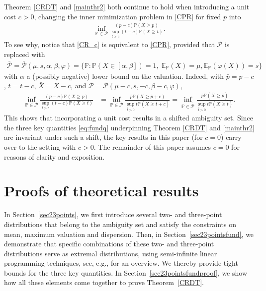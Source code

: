 \documentclass[11pt]{article}
\renewcommand{\P}{\mathbb{P}}
\newcommand{\E}{\mathbb{E}}
\newcommand{\Prob}{\mathbb{P}}
\newcommand{\bP}{\mathbb{P}}
\newcommand{\cP}{\mathcal{P}}
\newcommand{\1}{\mathds{1}}
\begin{document}
Theorem \ref{CRDT} and \ref{mainthr2} both continue to hold when introducing a unit cost $c>0$, changing the inner minimization problem in \eqref{CPR} for fixed $p$ into
\begin{align}\label{CR_c}
    \inf_{\bP\in\cP}\frac{(p-c)\bP(X\geq p)}{\sup_{t>c}(t-c)\bP(X\geq t)}.
\end{align}
To see why, notice that \eqref{CR_c} is equivalent to %
\eqref{CPR}, provided that $\cP$ is replaced with
\begin{align}  
\bar{\cP} = \bar{\cP}(\mu,s,\alpha,\beta,\varphi) =  \{\Prob :  \bP(X \in [\alpha,\beta])=1,\; \E_{\P}(X) = \mu, \E_{\P}(\varphi(X)) = s\}
    \label{eq:ambiguityk2}
\end{align}
with $\alpha$ a (possibly negative) lower bound on the valuation. Indeed, with $\bar{p}=p-c$, $\bar{t} = t - c$, $\bar{X} = X - c$, and $\bar{\cP} = \bar{\cP}(\mu-c,s,-c,\beta-c,\varphi)$,
\begin{align}
    \inf_{\bP\in\cP}\frac{(p-c)\bP(X\geq p)}{\sup_{t>c}(t-c)\bP(X\geq t)} &= \inf_{\bP\in\cP}\frac{\bar{p}\bP(X\geq \bar{p}+c)}{\sup_{\bar{t}>0}\bar{t}\bP(X\geq \bar{t}+c)}=\inf_{\bP\in\bar{\cP}}\frac{\bar{p}\bP(\bar{X}\geq \bar{p})}{\sup_{\bar{t}>0}\bar{t}\bP(\bar{X}\geq \bar{t})}.
\end{align}
This shows that incorporating a unit cost results in a shifted ambiguity set. Since the three key quantities \eqref{eq:fundq} underpinning Theorem \ref{CRDT} and \ref{mainthr2} are invariant under such a shift, the key results in this paper (for $c=0$) carry over to the setting with $c>0$. The remainder of this paper assumes 
$c=0$ for reasons of clarity and exposition. 

\section{Proofs of theoretical results}\label{prroooffs}
In Section~\ref{sec23points}, we first introduce several two- and three-point distributions that belong to the ambiguity set and satisfy the constraints on mean, maximum valuation and dispersion. Then, in Section~\ref{sec23pointsfund}, we demonstrate that specific combinations of these two- and three-point distributions serve as extremal distributions, using semi-infinite linear programming techniques, see, e.g., \cite{popescu2005semidefinite} for an overview. We thereby provide tight bounds for the three key quantities. In Section~\ref{sec23pointsfundproof}, we show how all these elements come together to prove Theorem~\ref{CRDT}.
\end{document}
